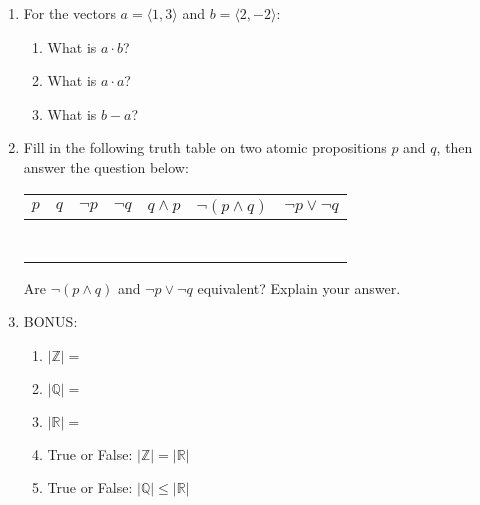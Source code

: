 \documentclass[11pt, oneside]{article}   	%
\newcommand{\reals}{\mathbb{R}}
\newcommand{\ints}{\mathbb{Z}}
\begin{document}
\begin{enumerate}
\clearpage
\item For the vectors $a=\langle 1,3 \rangle$ and $b=\langle2,-2\rangle$:
\begin{enumerate}
\item What is $a\cdot b$? \vspace{2em}
\item What is $a\cdot a$? \vspace{2em}
\item What is $b-a$? \vspace{2em}
\end{enumerate}

\item Fill in the following truth table on two atomic propositions $p$ and $q$, then answer the question below:\\
\begin{center}
\begin{tabular}{c|c||c|c|c|c|c}
$p$ & $q$ & $\neg p$ & $\neg q$ & $q \wedge p$ & $\neg (p \wedge q)$ & $\neg p \vee \neg q$\\
\hline
\hline
\hspace*{2em}& \hspace{2em} & \hspace{2em} & \hspace{2em} & \hspace{2em} & \hspace{2em} & \hspace{2em} \\
& & & & & &\\& & & & & &\\& & & & & &\\& & & & & &\\& & & & & &\\& & & & & &\\
\end{tabular}
\end{center}

Are $\neg (p \wedge q)$ and $\neg p \vee \neg q$ equivalent? Explain your answer.\vspace{4em}

\item BONUS: 
\begin{enumerate}
\item $|\ints|=$
\item $|\mathbb{Q}|=$
\item $|\reals|=$
\item True or False: $|\ints| = |\reals|$
\item True or False: $|\mathbb{Q}| \le |\reals|$
\end{enumerate}

\end{enumerate}
\end{document}
